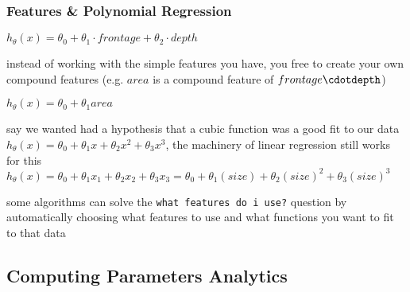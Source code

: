 \documentclass[11pt]{article}
\begin{document}
\subsubsection{Features \& Polynomial Regression}
\label{sec:orgb36163d}
\begin{description}
\item[{housing prices prediction}] \(h_{\theta}(x)=\theta_{0}+\theta_{1}\cdot frontage + \theta_{2} \cdot depth\)
\item instead of working with the simple features you have, you free to create your own compound features (e.g. \(area\) is a compound feature of \(frontage\cdotdepth\))
\item[{housing prices prediction with compound feature}] \(h_{\theta}(x)=\theta_{0}+\theta_{1}area\)
\item say we wanted had a hypothesis that a cubic function was a good fit
to our data
\(h_{\theta}(x)=\theta_{0}+\theta_{1}x+\theta_{2}x^{2}+\theta_{3}x^{3}\),
the machinery of linear regression still works for this
\(h_{\theta}(x)=\theta_{0}+\theta_{1}x_{1}+\theta_{2}x_{2}+\theta_{3}x_{3}=\theta_{0}+\theta_{1}(size)+\theta_{2}(size)^{2}+\theta_{3}(size)^3\)
\item some algorithms can solve the \texttt{what features do i use?} question by
automatically choosing what features to use and what functions you
want to fit to that data
\end{description}
\subsection{Computing Parameters Analytics}
\label{sec:org42c4ad3}
\end{document}

